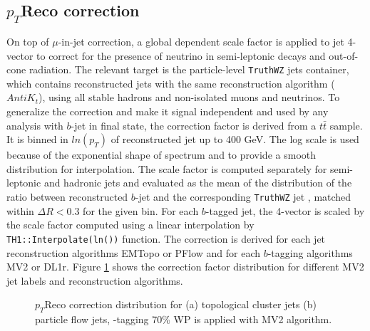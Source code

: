 \subsection{$p_T$Reco correction}
\label{Jet:Cal:BCal:pTReco}
On top of $\mu$-in-jet correction, a global \pT dependent scale factor is applied to jet 4-vector to correct for the presence of neutrino in semi-leptonic decays and out-of-cone radiation. 
The relevant target is the particle-level \texttt{TruthWZ} jets container,
which contains reconstructed jets with the same reconstruction algorithm ($AntiK_t$), 
using all stable hadrons and non-isolated muons and neutrinos. To generalize the correction and make it signal independent and used by any analysis with $b$-jet in final state, the correction factor is derived from a $t\bar{t}$ sample.
It is binned in $ln(p_T)$ of reconstructed jet up to 400 GeV. The log scale is used because of the exponential shape of \pT spectrum and to provide a smooth distribution for interpolation. The scale factor is computed separately for semi-leptonic and hadronic jets and evaluated as the mean of the distribution of the ratio between reconstructed $b$-jet \pT and the  corresponding \texttt{TruthWZ} jet \pT, matched within $\Delta R < 0.3$ for the given \pT bin. For each $b$-tagged jet, the 4-vector is scaled by the scale factor computed using a linear interpolation by \texttt{TH1::Interpolate(ln(\pT))} function.  The correction is derived for each jet reconstruction algorithms EMTopo or PFlow and for each $b$-tagging algorithms MV2 or DL1r. Figure \ref{fig:Jet:Cal:BCal:pTReco} shows the correction factor distribution for different MV2 jet labels and reconstruction algorithms. 
\begin{figure}[htbp]
   \centering
   \quad
   \caption{$p_T$Reco correction distribution for (a) topological cluster jets (b) particle flow jets, \bq-tagging 70\% WP is applied with MV2 algorithm.}
   \label{fig:Jet:Cal:BCal:pTReco}
\end{figure}
